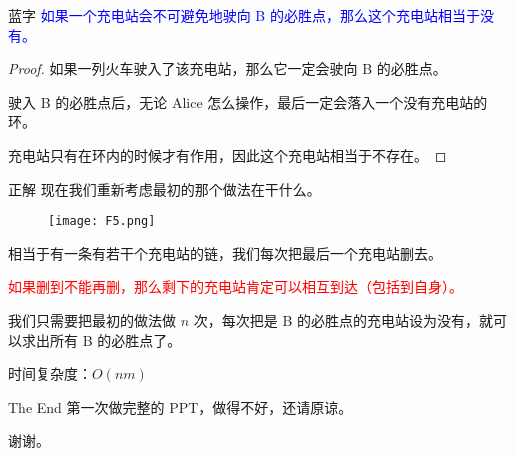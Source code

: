 \documentclass{ctexbeamer}
\begin{document}
	\begin{frame}{蓝字}
		\textcolor{blue}{如果一个充电站会不可避免地驶向 B 的必胜点，那么这个充电站相当于没有。}

		\begin{proof}
			如果一列火车驶入了该充电站，那么它一定会驶向 B 的必胜点。

			驶入 B 的必胜点后，无论 Alice 怎么操作，最后一定会落入一个没有充电站的环。

			充电站只有在环内的时候才有作用，因此这个充电站相当于不存在。
		\end{proof}
	\end{frame}

	\begin{frame}{正解}
		现在我们重新考虑最初的那个做法在干什么。

		\begin{figure}
			\texttt{[image: F5.png]}
		\end{figure}

		相当于有一条有若干个充电站的链，我们每次把最后一个充电站删去。

		\textcolor{red}{如果删到不能再删，那么剩下的充电站肯定可以相互到达（包括到自身）。}

		我们只需要把最初的做法做 $n$ 次，每次把是 B 的必胜点的充电站设为没有，就可以求出所有 B 的必胜点了。

		时间复杂度：$O(nm)$
	\end{frame}

	\begin{frame}[t]{The End}
		第一次做完整的 PPT，做得不好，还请原谅。

		谢谢。
	\end{frame}
\end{document}
